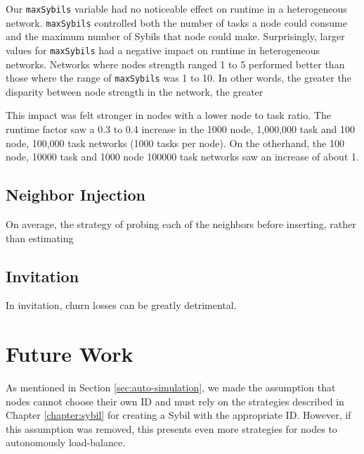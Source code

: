 Our \texttt{maxSybils} variable had no noticeable effect on runtime in a heterogeneous network.
\texttt{maxSybils} controlled both the number of tasks a node could consume and the maximum number of Sybils that node could make.
Surprisingly, larger values for \texttt{maxSybils} had a negative impact on runtime in heterogeneous networks.
Networks where nodes strength ranged 1 to 5 performed better than those where the range of \texttt{maxSybils} was 1 to 10.
In other words, the greater the disparity between node strength in the network, the greater 

This impact was felt stronger in nodes with a lower node to task ratio.
The runtime factor saw  a 0.3 to 0.4 increase in the 1000 node, 1,000,000 task and 100 node, 100,000 task networks (1000 tasks per node).
On the otherhand, the 100 node, 10000 task  and 1000 node 100000 task networks saw an increase of about 1.



\subsection{Neighbor Injection}


On average, the strategy of probing each of the neighbors before inserting, rather than estimating 
\subsection{Invitation}

In invitation, churn losses can be greatly detrimental.

\section{Future Work}

As mentioned in Section \ref{sec:auto-simulation}, we made the assumption that nodes cannot choose their own ID and must rely on the strategies described in Chapter \ref{chapter:sybil}  \cite{sybil-analysis} for creating a Sybil with the appropriate ID.
However, if this assumption was removed, this presents even more strategies for nodes to autonomously load-balance.